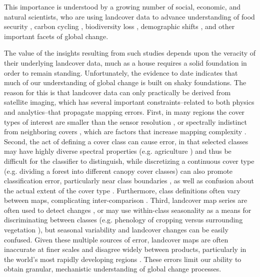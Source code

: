 \documentclass{pnastwo}
\begin{document}
\begin{article}
This importance is understood by a growing number of social, economic, and natural scientists, who are using landcover data to advance understanding of food security \cite{lark_cropland_2015,wright_recent_2013, licker_mind_2010}, carbon cycling \cite{asner_high-resolution_2010, gaveau_major_2014}, biodiversity loss \cite{newbold_global_2015, luoto_predicting_2004}, demographic shifts \cite{linard_assessing_2010}, and other important facets of global change. 

The value of the insights resulting from such studies depends upon the veracity of their underlying landcover data, much as a house requires a solid foundation in order to remain standing. Unfortunately, the evidence to date indicates that much of our understanding of global change is built on shaky foundations. The reason for this is that landcover data can only practically be derived from satellite imaging, which has several important constraints--related to both physics and analytics--that propagate mapping errors. First, in many regions the cover types of interest are smaller than the sensor resolution \cite[e.g. smallholder's farms][]{jain_mapping_2013,debats_generalized_2015,ozdogan_resolution_2006}, or spectrally indistinct from neighboring covers \cite{sweeney_mapping_2015}, which are factors that increase mapping complexity \cite{yu_meta-discoveries_2014}. Second, the act of defining a cover class can cause error, in that selected classes may have highly diverse spectral properties (e.g. agriculture \cite{debats_generalized_2015,estes_platform_2015}) and thus be difficult for the classifier to distinguish, while discretizing a continuous cover type (e.g. dividing a forest into different canopy cover classes) can also promote classification error, particularly near class boundaries \cite{foody_status_2002}, as well as confusion about the actual extent of the cover type \cite{sexton_conservation_2015}. Furthermore, class definitions often vary between maps, complicating inter-comparison \cite{kuemmerle_challenges_2013}. Third, landcover map series are often used to detect changes \cite[e.g.][]{gross_monitoring_2013}, or may use within-class seasonality as a means for discriminating between classes (e.g. phenology of cropping versus surrounding vegetation \cite{sweeney_mapping_2015}), but seasonal variability and landcover changes can be easily confused. Given these multiple sources of error, landcover maps are often inaccurate at finer scales and disagree widely between products, particularly in the world's most rapidly developing regions \cite{estes_projected_2013, fritz_comparison_2010, fritz_cropland_2011}. These errors limit our ability to obtain granular, mechanistic understanding of global change processes. 


\end{article}
\end{document}
